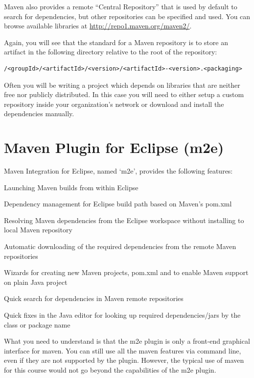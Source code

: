\documentclass{article}
\begin{document}
Maven also provides a remote ``Central Repository''  that is used by
default to search for dependencies, but other repositories can be
specified and used. You can browse available libraries at
\url{http://repo1.maven.org/maven2/}.

Again, you will see that the standard for a Maven repository is to store
an artifact in the following directory relative to the root of the
repository: 
\begin{lstlisting}
/<groupId>/<artifactId>/<version>/<artifactId>-<version>.<packaging>
\end{lstlisting}

Often you will be writing a project which depends on libraries that
are neither free nor publicly distributed. In this case you will need
to either setup a custom repository inside your organization's network
or download and install the dependencies manually.

\section{Maven Plugin for Eclipse (m2e)}

Maven Integration for Eclipse, named `m2e', provides the following features:
\begin{compactitem}
\item Launching Maven builds from within Eclipse
\item Dependency management for Eclipse build path based on Maven's pom.xml
\item Resolving Maven dependencies from the Eclipse workspace without installing to local Maven repository
\item Automatic downloading of the required dependencies from the remote Maven repositories
\item Wizards for creating new Maven projects, pom.xml and to enable Maven support on plain Java project
\item Quick search for dependencies in Maven remote repositories
\item Quick fixes in the Java editor for looking up required dependencies/jars by the class or package name
\end{compactitem}

What you need to understand is that the m2e plugin is only a
front-end graphical interface for maven. You can still use all the
maven features via command line, even if they are not supported by the
plugin. However, the typical use of maven for this course would not go
beyond the capabilities of the m2e plugin. 
\end{document}
